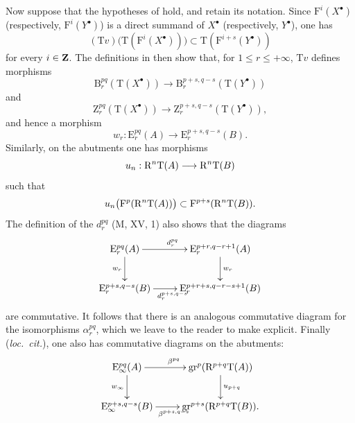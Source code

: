 \begin{env}[13.6.5]
\label{0.13.6.5}
Now suppose that the hypotheses of  hold, and retain
its notation.
Since $\mathrm{F}^i(X^\bullet)$ (respectively,
$\mathrm{F}^i(Y^\bullet)$) is a direct summand of $X^\bullet$
(respectively, $Y^\bullet$), one has
\[
  (\mathrm{T}v)\bigl(\mathrm{T}(\mathrm{F}^i(X^\bullet))\bigr)
  \subset
  \mathrm{T}(\mathrm{F}^{i+s}(Y^\bullet))
\]
for every $i\in\mathbf{Z}$.
The definitions in  then show that, for
$1\leq r\leq+\infty$, $\mathrm{T}v$ defines morphisms
\[
  \mathrm{B}_r^{pq}(\mathrm{T}(X^\bullet))
  \longrightarrow
  \mathrm{B}_r^{p+s,q-s}(\mathrm{T}(Y^\bullet))
\]
and
\[
  \mathrm{Z}_r^{pq}(\mathrm{T}(X^\bullet))
  \longrightarrow
  \mathrm{Z}_r^{p+s,q-s}(\mathrm{T}(Y^\bullet)),
\]
and hence a morphism
\[
  w_r:
  \mathrm{E}_r^{pq}(A)
  \longrightarrow
  \mathrm{E}_r^{p+s,q-s}(B).
\]
Similarly, on the abutments one has morphisms
\[
  u_n:
  \mathrm{R}^n\mathrm{T}(A)
  \longrightarrow
  \mathrm{R}^n\mathrm{T}(B)
\]
such that
\[
  u_n\bigl(\mathrm{F}^p(\mathrm{R}^n\mathrm{T}(A))\bigr)
  \subset
  \mathrm{F}^{p+s}(\mathrm{R}^n\mathrm{T}(B)).
\]
The definition of the $d_r^{pq}$ (M, XV, 1) also shows that the
diagrams
\[
  \xymatrix{
    \mathrm{E}_r^{pq}(A)
      \ar[r]^{d_r^{pq}}\ar[d]_{w_r}
    &
    \mathrm{E}_r^{p+r,q-r+1}(A)
      \ar[d]^{w_r}
    \\
    \mathrm{E}_r^{p+s,q-s}(B)
      \ar[r]_{d_r^{p+s,q-s}}
    &
    \mathrm{E}_r^{p+r+s,q-r-s+1}(B)
  }
\]
are commutative.
It follows that there is an analogous commutative diagram for the
isomorphisms $\alpha_r^{pq}$, which we leave to the reader to make
explicit.
Finally (\emph{loc.\ cit.}), one also has commutative diagrams on the
abutments:
\[
  \xymatrix{
    \mathrm{E}_\infty^{pq}(A)
      \ar[r]^{\beta^{pq}}\ar[d]_{w_\infty}
    &
    \mathrm{gr}^p(\RR^{p+q}\mathrm{T}(A))
      \ar[d]^{u_{p+q}}
    \\
    \mathrm{E}_\infty^{p+s,q-s}(B)
      \ar[r]_{\beta^{p+s,q-s}}
    &
    \mathrm{gr}^{p+s}(\RR^{p+q}\mathrm{T}(B)).
  }
\]
\end{env}

